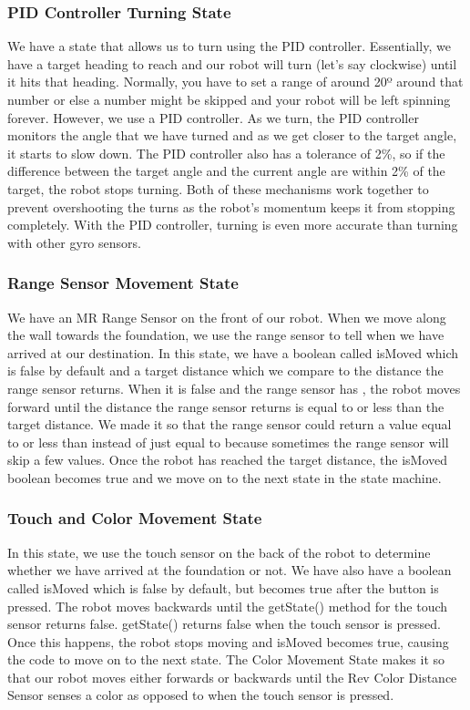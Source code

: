 \documentclass{article}[12pt]
\begin{document}
\subsubsection{PID Controller Turning State}

We have a state that allows us to turn using the PID controller. Essentially, we have a target heading to reach and our robot will turn (let’s say clockwise) until it hits that heading. Normally, you have to set a range of around 20º around that number or else a number might be skipped and your robot will be left spinning forever. However, we use a PID controller. As we turn, the PID controller monitors the angle that we have turned and as we get closer to the target angle, it starts to slow down. The PID controller also has a tolerance of 2\%, so if the difference between the target angle and the current angle are within 2\% of the target, the robot stops turning. Both of these mechanisms work together to prevent overshooting the turns as the robot’s momentum keeps it from stopping completely. With the PID controller, turning is even more accurate than turning with other gyro sensors. 


\subsubsection{Range Sensor Movement State}

We have an MR Range Sensor on the front of our robot. When we move along the wall towards the foundation, we use the range sensor to tell when we have arrived at our destination. In this state, we have a boolean called isMoved which is false by default  and a target distance which we compare to the distance the range sensor returns. When it is false and the range sensor has , the robot moves forward until the distance the range sensor returns is equal to or less than the target distance. We made it so that the range sensor could return a value equal to or less than instead of just equal to because sometimes the range sensor will skip a few values. Once the robot has reached the target distance, the isMoved boolean becomes true and we move on to the next state in the state machine.

\subsubsection{Touch and Color Movement State}

In this state, we use the touch sensor on the back of the robot to determine whether we have arrived at the foundation or not. We have also have a boolean called isMoved which is false by default, but becomes true after the button is pressed. The robot moves backwards until the getState() method for the touch sensor returns false. getState() returns false when the touch sensor is pressed. Once this happens, the robot stops moving and isMoved becomes true, causing the code to move on to the next state. The Color Movement State makes it so that our robot moves either forwards or backwards until the Rev Color Distance Sensor senses a color as opposed to when the touch sensor is pressed. 
\end{document}
